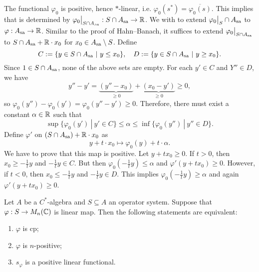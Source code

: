 \begin{myproof}
    The functional $\varphi_0$ is positive, hence $*$-linear, i.e. $\varphi_0 (s^*) = \overline{\varphi_0 (s)} $.
    This implies that is determined by $\varphi_0\big|_{S \cap A_{sa}}: S \cap A_{\operatorname{sa}} \to \mathbb {R}$. 
    We with to extend $\varphi_0 \big|_S \cap A_{\operatorname{sa}}$ to $\varphi: A_{\operatorname{sa}} \to \mathbb {R}$.
    Similar to the proof of Hahn--Banach, it suffices to extend $\varphi_0 \big|_{S \cap A_{\operatorname{sa}}}$ to
    $S \cap A_{\operatorname{sa}} + \mathbb {R} \cdot x_0$ for $x_0 \in A_{\operatorname{sa}} \setminus S$. Define 
    $$C := \{y \in S \cap A_{\operatorname{sa}}\ |\ y \leq x_0\},\quad D := \{y \in S \cap A_{\operatorname{sa}}\ |\ y \geq x_0\}.$$
    Since $1 \in S \cap A_{\operatorname{sa}}$, none of the above sets are empty.
    For each $y' \in C$ and $Y'' \in D$, we have 
    $$y'' - y' = \underbrace{(y'' - x_0)}_{\geq 0} + \underbrace{(x_0 - y')}_{\geq 0} \geq 0,$$
    so $\varphi_0 (y'') - \varphi_0 (y') = \varphi_0 (y'' - y') \geq 0$.
    Therefore, there must exist a constant $\alpha \in \mathbb {R}$ such that
    $$\sup \{\varphi_0 (y')\ |\ y' \in C\} \leq \alpha \leq \inf \{\varphi_0 (y'')\ |\ y'' \in D\}.$$
    Define $\varphi'$ on $(S \cap A_{\operatorname{sa}}) + \mathbb {R} \cdot x_0$ as 
    $$y + t \cdot x_0 \mapsto \varphi_0 (y) + t \cdot \alpha.$$
    We have to prove that this map is positive. Let $y + t x_0 \geq 0$.
    If $t > 0$, then $x_0 \geq -\frac{1}{t} y$ and $-\frac{1}{t} y \in C$.
    But then $\varphi_0 \left(-\frac{1}{t} y\right) \leq \alpha$ and $\varphi' (y + t x_0) \geq 0$.
    However, if $t < 0$, then $x_0 \leq -\frac{1}{t} y$ and $-\frac{1}{t} y \in D$.
    This implies $\varphi_0 \left(-\frac{1}{t} y\right) \geq \alpha$ and again $\varphi' (y + t x_0) \geq 0$.
\end{myproof}

\begin{proposition}
    Let $A$ be a $C^*$-algebra and $S \subseteq A$ an operator system.
    Suppose that $\varphi: S \to M_n (\mathbb {C})$ is linear map. Then the following statements are equivalent:
    \begin{enumerate}
        \item $\varphi$ is cp;
        \item $\varphi$ is $n$-positive;
        \item $s_\varphi$ is a positive linear functional.
    \end{enumerate}
\end{proposition}

